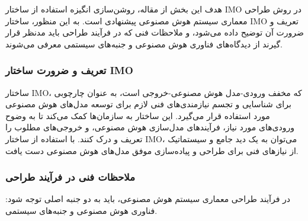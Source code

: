 \documentclass[a4paper,10pt]{article}
\begin{document}
            هدف این بخش از مقاله، روشن‌سازی انگیزه استفاده از ساختار IMO در روش طراحی معماری سیستم هوش مصنوعی پیشنهادی است. به این منظور، ساختار IMO تعریف و ضرورت آن توضیح داده می‌شود، و ملاحظات فنی که در فرآیند طراحی باید مدنظر قرار گیرند از دیدگاه‌های فناوری هوش مصنوعی و جنبه‌های سیستمی معرفی می‌شوند.

            \subsubsection{تعریف و ضرورت ساختار IMO}

                ساختار IMO، که مخفف ورودی-مدل هوش مصنوعی-خروجی است، به عنوان چارچوبی برای شناسایی و تجسم نیازمندی‌های فنی لازم برای توسعه مدل‌های هوش مصنوعی مورد استفاده قرار می‌گیرد. این ساختار به سازمان‌ها کمک می‌کند تا به وضوح ورودی‌های مورد نیاز، فرآیندهای مدل‌سازی هوش مصنوعی، و خروجی‌های مطلوب را تعریف و درک کنند. با استفاده از ساختار IMO، می‌توان به یک دید جامع و سیستماتیک از نیازهای فنی برای طراحی و پیاده‌سازی موفق مدل‌های هوش مصنوعی دست یافت.

            \subsubsection{ملاحظات فنی در فرآیند طراحی}

                در فرآیند طراحی معماری سیستم هوش مصنوعی، باید به دو جنبه اصلی توجه شود: فناوری هوش مصنوعی و جنبه‌های سیستمی.
\end{document}
